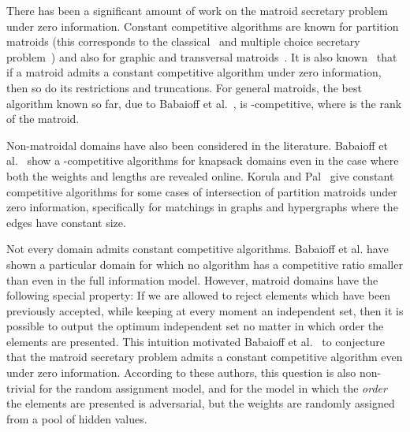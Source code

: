 \documentclass[letterpaper,11pt]{article}
\theoremstyle{definition}
\theoremstyle{remark}
\begin{document}
There has been a significant amount of work on the matroid secretary problem under zero information. Constant competitive algorithms are known for partition matroids (this corresponds to the classical~\cite{lindley_dynamic_1961,dynkin_optimum_1963} and multiple choice secretary problem~\cite{kleinberg_multiple-choice_2005,babaioff_knapsack_2007}) and also for graphic and transversal matroids~\cite{babaioff_matroids_2007,dimitrov_competitive_2008,korula2009algorithms,babaioff_secretary_2009}. It is also known~\cite{babaioff_matroids_2007} that if a matroid admits a constant competitive algorithm under zero information, then so do its restrictions and truncations. For general matroids, the best algorithm known so far, due to Babaioff et al.~\cite{babaioff_matroids_2007}, is -competitive, where  is the rank of the matroid.

Non-matroidal domains have also been considered in the literature. Babaioff et al.~\cite{babaioff_knapsack_2007} show a -competitive algorithms for knapsack domains even in the case where both the weights and lengths are revealed online. Korula and Pal~\cite{korula2009algorithms} give constant competitive algorithms for some cases of intersection of partition matroids under zero information, specifically for matchings in graphs and hypergraphs where the edges have constant size.

Not every domain admits constant competitive algorithms. Babaioff et al. \cite{babaioff_matroids_2007} have shown a particular domain for which no algorithm has a competitive ratio smaller than  even in the full information model. However, matroid domains have the following special property: If we are allowed to reject elements which have been previously accepted, while keeping at every moment an independent set, then it is possible to output the optimum independent set no matter in which order the elements are presented. This intuition motivated Babaioff et al.~\cite{babaioff_matroids_2007, babaioff_online_2008} to conjecture that the matroid secretary problem admits a constant competitive algorithm even under zero information. According to these authors, this question is also non-trivial for the random assignment model, and for the model in which the \emph{order} the elements are presented is adversarial, but the weights are randomly assigned from a pool of hidden values.
\end{document}
